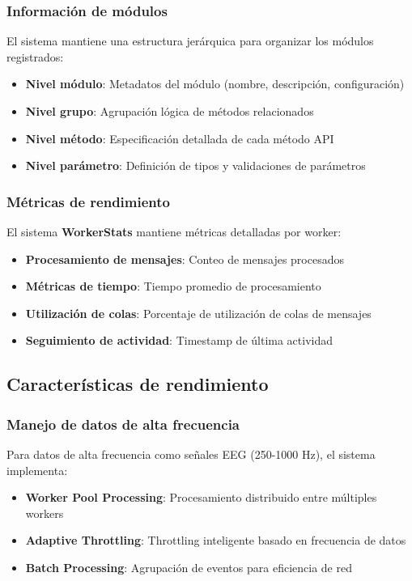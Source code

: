 \subsubsection{Información de módulos}

El sistema mantiene una estructura jerárquica para organizar los módulos registrados:

\begin{itemize}
    \item \textbf{Nivel módulo}: Metadatos del módulo (nombre, descripción, configuración)
    \item \textbf{Nivel grupo}: Agrupación lógica de métodos relacionados
    \item \textbf{Nivel método}: Especificación detallada de cada método API
    \item \textbf{Nivel parámetro}: Definición de tipos y validaciones de parámetros
\end{itemize}

\subsubsection{Métricas de rendimiento}

El sistema \textbf{WorkerStats} mantiene métricas detalladas por worker:
\begin{itemize}
    \item \textbf{Procesamiento de mensajes}: Conteo de mensajes procesados
    \item \textbf{Métricas de tiempo}: Tiempo promedio de procesamiento
    \item \textbf{Utilización de colas}: Porcentaje de utilización de colas de mensajes
    \item \textbf{Seguimiento de actividad}: Timestamp de última actividad
\end{itemize}

\subsection{Características de rendimiento}
\label{subsec:rendimiento_api_explorer}

\subsubsection{Manejo de datos de alta frecuencia}

Para datos de alta frecuencia como señales EEG (250-1000 Hz), el sistema implementa:
\begin{itemize}
    \item \textbf{Worker Pool Processing}: Procesamiento distribuido entre múltiples workers
    \item \textbf{Adaptive Throttling}: Throttling inteligente basado en frecuencia de datos
    \item \textbf{Batch Processing}: Agrupación de eventos para eficiencia de red
\end{itemize}

